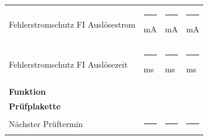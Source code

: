 \documentclass[11pt,a4paper,final,oneside,notitlepage]{report}
\begin{document}
\begin{tabularx}{\textwidth}{|p{}| p{}|p{}|p{}|}
		{\scriptsize Fehlerstromschutz FI Auslösestrom } &
		\rule{0.1\textwidth}{0.05mm}\hspace{1mm} mA
		\makebox[0pt][l]{$\square$}\raisebox{.15ex}{\hspace{0.1em}} &
		\cellcolor{gray!10}\rule{0.1\textwidth}{0.05mm}\hspace{1mm} mA
		\makebox[0pt][l]{$\square$}\raisebox{.15ex}{\hspace{0.1em}} &
		\rule{0.1\textwidth}{0.05mm}\hspace{1mm} mA
		\makebox[0pt][l]{$\square$}\raisebox{.15ex}{\hspace{0.1em}}\\
		{\scriptsize Fehlerstromschutz FI Auslösezeit } &
		\rule{0.1\textwidth}{0.05mm}\hspace{1mm} ms
		\makebox[0pt][l]{$\square$}\raisebox{.15ex}{\hspace{0.1em}} &
		\cellcolor{gray!10}\rule{0.1\textwidth}{0.05mm}\hspace{1mm} ms
		\makebox[0pt][l]{$\square$}\raisebox{.15ex}{\hspace{0.1em}} &
		\rule{0.1\textwidth}{0.05mm}\hspace{1mm} ms
		\makebox[0pt][l]{$\square$}\raisebox{.15ex}{\hspace{0.1em}}\\
		\hline
		\rule{0pt}{15pt}\textbf{Funktion} & \raggedleft\arraybackslash\makebox[0pt][l]{$\square$}\raisebox{.15ex}{\hspace{0.1em}}\,\,\,\,\,\,\,&
		\cellcolor{gray!10}\raggedleft\arraybackslash\makebox[0pt][l]{$\square$}\raisebox{.15ex}{\hspace{0.1em}}\,\,\,\,\,\,\,&
		\raggedleft\arraybackslash\makebox[0pt][l]{$\square$}\raisebox{.15ex}{\hspace{0.1em}}\,\,\,\,\,\,\,\\[.25ex]
		\hline
		\rule{0pt}{15pt}\textbf{Prüfplakette} & \raggedleft\arraybackslash\makebox[0pt][l]{$\square$}\raisebox{.15ex}{\hspace{0.1em}}\,\,\,\,\,\,\, &
		\cellcolor{gray!10}\raggedleft\arraybackslash\makebox[0pt][l]{$\square$}\raisebox{.15ex}{\hspace{0.1em}}\,\,\,\,\,\,\, &
		\raggedleft\arraybackslash\makebox[0pt][l]{$\square$}\raisebox{.15ex}{\hspace{0.1em}}\,\,\,\,\,\,\, \\[.25ex]
		{\scriptsize Nächster Prüftermin } &
		\rule{0.15\textwidth}{0.05mm} &
		\cellcolor{gray!10}\rule{0.15\textwidth}{0.05mm} &
		\rule{0.15\textwidth}{0.05mm}

\end{tabularx}
\end{document}
